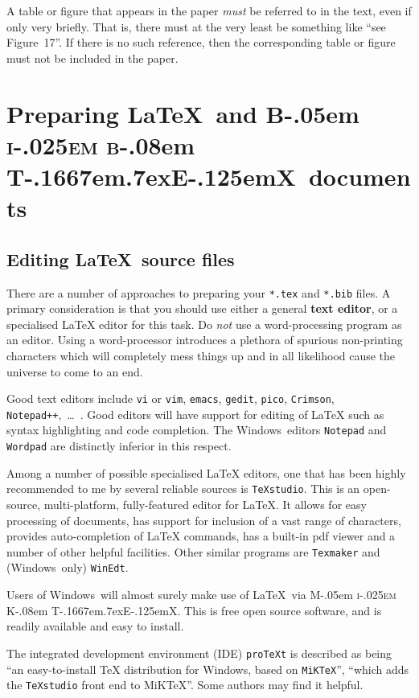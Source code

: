 \documentclass[times, doublespace]{anzsauth}
\newcommand\BibTeX{{\rmfamily B\kern-.05em \textsc{i\kern-.025em b}\kern-.08em
T\kern-.1667em\lower.7ex\hbox{E}\kern-.125emX}}
\newcommand\MiKTeX{{\rmfamily M\kern-.05em \textsc{i\kern-.025em K}\kern-.08em
T\kern-.1667em\lower.7ex\hbox{E}\kern-.125emX}}
\begin{document}
A table or figure that appears in the paper \emph{must} be referred
to in the text, even if only very briefly.  That is, there must
at the very least be something like ``see Figure~17''.  If there
is no such reference, then the corresponding table or figure must
not be included in the paper.

\section{Preparing \LaTeX\ and \BibTeX\ documents}
\label{sec:prepDocs}

\subsection{Editing \LaTeX\ source files}
\label{sec:editors}

There are a number of approaches to preparing your \texttt{*.tex}
and \texttt{*.bib} files. A primary consideration is that you should
use either a general \textbf{text editor}, or a specialised \LaTeX{}
editor for this task.  Do \emph{not} use a word-processing program as
an editor. Using a word-processor introduces a plethora of spurious
non-printing characters which will completely mess things up and
in all likelihood cause the universe to come to an end.

Good text editors include \texttt{vi} or \texttt{vim},
\texttt{emacs}, \texttt{gedit}, \texttt{pico}, \texttt{Crimson},
\texttt{Notepad++},~\ldots\ .  Good editors will have support
for editing of \LaTeX{} such as syntax highlighting and code
completion. The Windows\texttrademark\ editors \texttt{Notepad}
and \texttt{Wordpad} are distinctly inferior in this respect.

Among a number of possible specialised \LaTeX{} editors, one that
has been highly recommended to me by several reliable sources
is \texttt{TeXstudio}. This is an open-source, multi-platform,
fully-featured editor for \LaTeX{}. It allows for easy processing of
documents, has support for inclusion of a vast range of characters,
provides auto-completion of \LaTeX{} commands, has a built-in pdf
viewer and a number of other helpful facilities. Other similar
programs are \texttt{Texmaker} and (Windows\texttrademark\ only)
\texttt{WinEdt}.

Users of Windows\texttrademark\ will almost surely make use of
\LaTeX\ via \MiKTeX.  This is free open source software, and is
readily available and easy to install.

The integrated development environment (IDE) \texttt{proTeXt} is
described as being ``an easy-to-install \TeX{} distribution for
Windows\texttrademark, based on \texttt{MiKTeX}'', ``which adds
the \texttt{TeXstudio} front end to MiKTeX''.  Some authors may
find it helpful.
\end{document}
